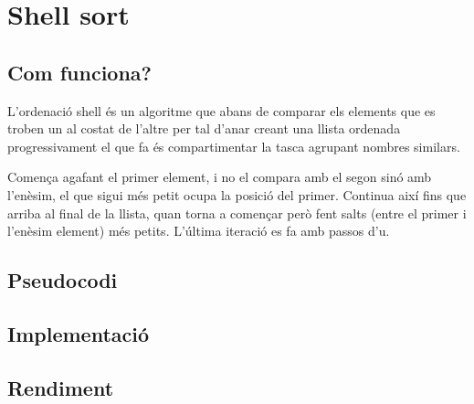 \chapter{Shell sort}

\section{Com funciona?}
L'ordenació shell és un algoritme que abans de comparar els elements que es troben un al costat de l'altre per tal d'anar creant una llista ordenada progressivament el que fa és compartimentar la tasca agrupant nombres similars.

Comença agafant el primer element, i no el compara amb el segon sinó amb l'enèsim, el que sigui més petit ocupa la posició del primer. Continua així fins que arriba al final de la llista, quan torna a començar però fent salts (entre el primer i l'enèsim element) més petits.
L'última iteració es fa amb passos d'u.

\section{Pseudocodi}

\section{Implementació}


\section{Rendiment}
\noindent
\makebox[\textwidth][c]{
	
}
\vspace*{1em}
